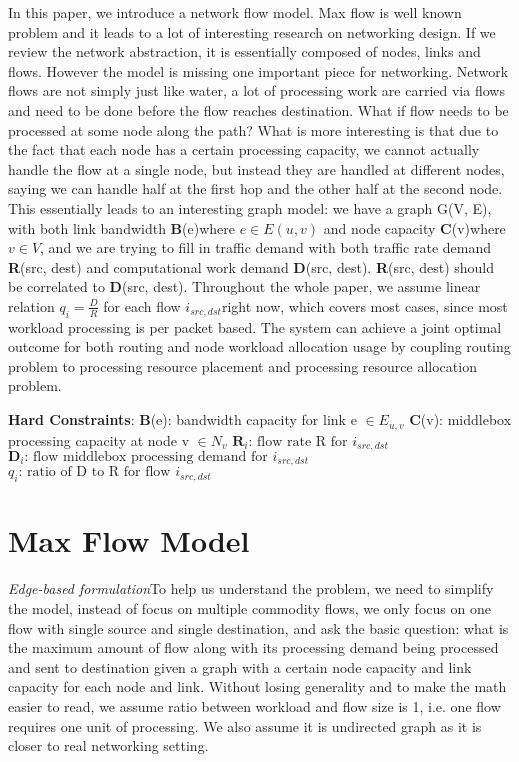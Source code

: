 \documentclass[twoside,leqno, 11pt]{article}
\begin{document}
 In this paper, we introduce a network flow model. Max flow is well known problem \cite{FordFulkerson, Edmonds1972} and it leads to a lot of interesting research on networking design. If we review the network abstraction, it is essentially composed of nodes, links and flows. However the model is missing one important piece for networking. Network flows are not simply just like water, a lot of processing work are carried via flows and need to be done before the flow reaches destination. What if flow needs to be processed at some node along the path? What is more interesting is that due to the fact that each node has a certain processing capacity, we cannot actually handle the flow at a single node, but instead they are handled at different nodes, saying we can handle half at the first hop and the other half at the second node. This essentially leads to an interesting graph model: we have a graph G(V, E), with both link bandwidth \textbf{B}(e)where $e \in E(u,v)$ and node capacity \textbf{C}(v)where $v \in V $, and we are trying to fill in traffic demand with both traffic rate demand \textbf{R}(src, dest) and computational work demand \textbf{D}(src, dest). \textbf{R}(src, dest) should be correlated to \textbf{D}(src, dest). Throughout the whole paper, we assume linear relation $q_i = \frac{D}{R}$ for each flow $ i_{src,dst} $right now, which covers most cases, since most workload processing is per packet based. The system can achieve a joint optimal outcome for both routing and node workload allocation usage by coupling routing problem to processing resource placement and processing resource allocation problem.  
 
\textbf{Hard Constraints}:
\newline
\textbf{B}(e): bandwidth capacity for link e $\in E_{u,v}$
 \newline
\textbf{C}(v): middlebox processing capacity at node v $\in N_{v}$
 \newline
$ \boldsymbol{R}_{i} \text{: flow rate R for } i_{src, dst}$ 
\newline
$ \boldsymbol{D}_{i} \text{: flow middlebox processing demand for } i_{src, dst}$
\newline 
$ q_{i} \text{: ratio of D to R for flow } i_{src, dst}$ 
\section{Max Flow Model}
\textit{Edge-based formulation}To help us understand the problem, we need to simplify the model, instead of focus on multiple commodity flows, we only focus on one flow with single source and single destination, and ask the basic question: what is the maximum amount of flow along with its processing demand being processed and sent to destination given a graph with a certain node capacity and link capacity for each node and link. Without losing generality and to make the math easier to read, we assume ratio between workload and flow size is 1, i.e. one flow requires one unit of processing. We also assume it is undirected graph as it is closer to real networking setting. %
\end{document}
